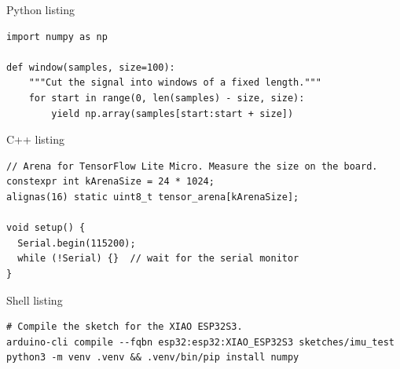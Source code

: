 \documentclass[10pt]{beamer}
\begin{document}
\begin{frame}[fragile]{Python listing}
  \begin{lstlisting}[style=python]
import numpy as np

def window(samples, size=100):
    """Cut the signal into windows of a fixed length."""
    for start in range(0, len(samples) - size, size):
        yield np.array(samples[start:start + size])
  \end{lstlisting}
\end{frame}

\begin{frame}[fragile]{C++ listing}
  \begin{lstlisting}[style=cpp]
// Arena for TensorFlow Lite Micro. Measure the size on the board.
constexpr int kArenaSize = 24 * 1024;
alignas(16) static uint8_t tensor_arena[kArenaSize];

void setup() {
  Serial.begin(115200);
  while (!Serial) {}  // wait for the serial monitor
}
  \end{lstlisting}
\end{frame}

\begin{frame}[fragile]{Shell listing}
  \begin{lstlisting}[style=shell]
# Compile the sketch for the XIAO ESP32S3.
arduino-cli compile --fqbn esp32:esp32:XIAO_ESP32S3 sketches/imu_test
python3 -m venv .venv && .venv/bin/pip install numpy
  \end{lstlisting}
\end{frame}


\end{document}
